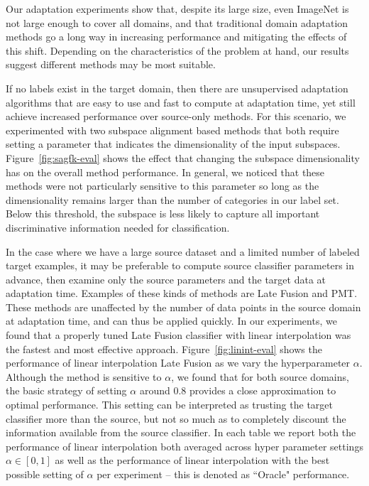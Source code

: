 Our adaptation experiments show that, despite its large size, even ImageNet is not large enough to cover all domains, and
that traditional domain adaptation methods go a long way in increasing performance and mitigating the effects of this shift.
Depending on the characteristics of the problem at hand, our results suggest different methods may be most suitable.

If no labels exist in the target domain, then there are unsupervised adaptation algorithms that are easy to use and fast to compute at adaptation time, yet still achieve increased performance over source-only methods. 
For this scenario, we experimented with two subspace alignment based methods that both require setting a parameter that indicates the dimensionality of the input subspaces. 
Figure~\ref{fig:sagfk-eval} shows the effect that changing the subspace dimensionality has on the overall method performance. 
In general, we noticed that these methods were not particularly sensitive to this parameter so long as the dimensionality remains larger than the number of categories in our label set.
Below this threshold, the subspace is less likely to capture all important discriminative information needed for classification.

In the case where we have a large source dataset and a limited number of labeled target examples, it may be preferable to compute source classifier parameters in advance, then examine only the source parameters and the target data at adaptation time.
Examples of these kinds of methods are Late Fusion and PMT.
These methods are unaffected by the number of data points in the source domain at adaptation time, and can thus be applied quickly.
In our experiments, we found that a properly tuned Late Fusion classifier with linear interpolation was the fastest and most effective approach.
Figure~\ref{fig:linint-eval} shows the performance of linear interpolation Late Fusion as we vary the hyperparameter $\alpha$.
Although the method is sensitive to $\alpha$, we found that for both source domains, the basic strategy of setting $\alpha$ around $0.8$ provides a close approximation to optimal performance. 
This setting can be interpreted as trusting the target classifier more than the source, but not so much as to completely discount the information available from the source classifier. In each table we report both the performance of linear interpolation both averaged across hyper parameter settings $\alpha \in [0,1]$ as well as the performance of linear interpolation with the best possible setting of $\alpha$ per experiment -- this is denoted as ``Oracle" performance.

